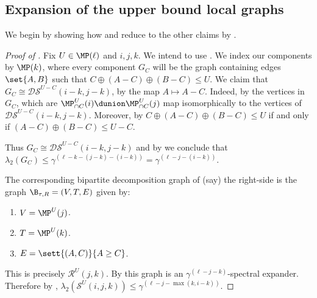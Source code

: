 \subsection{Expansion of the upper bound local graphs}
We begin by showing how  and  reduce to the other claims by .
\begin{proof}[Proof of ]
    Fix \(U \in \MP(\ell)\) and \(i,j,k\). We intend to use . We index our components by \(\MP(k)\), where every component \(G_C\) will be the graph containing edges \(\set{A,B}\) such that \(C \oplus (A-C) \oplus (B-C) \leq U\). We claim that \(G_C \cong \mathcal{DS}^{U-C}(i-k,j-k)\), by the map \(A \mapsto A-C\). Indeed, by  the vertices in \(G_C\), which are \(\MP^U_{\cap C}(i)\dunion \MP^U_{\cap C}(j)\) map isomorphically to the vertices of \(\mathcal{DS}^{U-C}(i-k,j-k)\). Moreover, by  \(C \oplus (A-C) \oplus (B-C) \leq U\) if and only if \((A-C) \oplus (B-C) \leq U-C\). 
    
    Thus \(G_C \cong \mathcal{DS}^{U-C}(i-k,j-k)\) and by  we conclude that \(\lambda_2(G_C) \leq \gamma^{(\ell-k-(j-k)-(i-k))}=\gamma^{ (\ell-j-(i-k))}\).
    
    The corresponding bipartite decomposition graph of (say) the right-side is the graph \(\B_{\tau,R}=(V,T,E)\) given by:
    \begin{enumerate}
        \item \(V = \MP^U(j)\).
        \item \(T=\MP^U(k)\).
        \item \(E = \sett{(A,C)}{A \geq C}\).
    \end{enumerate}
    This is precisely \(\mathcal{R}^U(j,k)\). By  this graph is an \(\gamma^{(\ell-j-k)}\)-spectral expander. Therefore by , \(\lambda_2(\mathcal{S}^{U}(i,j,k)) \leq \gamma^{(\ell-j-\max(k,i-k))}\).
\end{proof}

